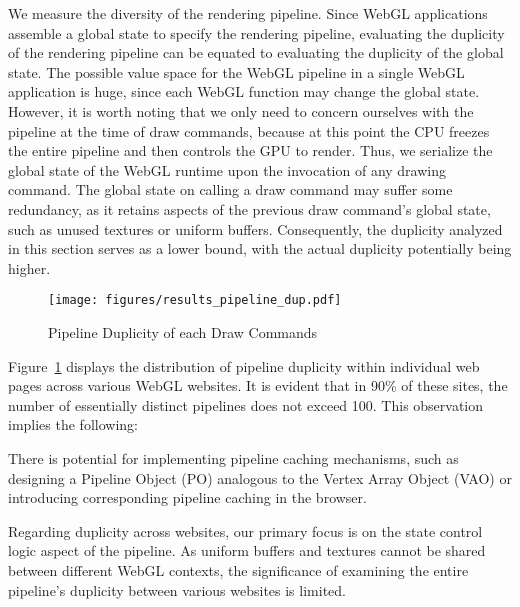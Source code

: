 We measure the diversity of the rendering pipeline. Since WebGL applications assemble a global state to specify the rendering pipeline, evaluating the duplicity of the rendering pipeline can be equated to evaluating the duplicity of the global state. The possible value space for the WebGL pipeline in a single WebGL application is huge, since each WebGL function may change the global state. However, it is worth noting that we only need to concern ourselves with the pipeline at the time of draw commands, because at this point the CPU freezes the entire pipeline and then controls the GPU to render. Thus, we serialize the global state of the WebGL runtime upon the invocation of any drawing command. 
The global state on calling a draw command may suffer some redundancy, as it retains aspects of the previous draw command’s global state, such as unused textures or uniform buffers. Consequently, the duplicity analyzed in this section serves as a lower bound, with the actual duplicity potentially being higher.

\begin{figure}[tp]
\centering
\texttt{[image: figures/results\_pipeline\_dup.pdf]}
\caption{Pipeline Duplicity of each Draw Commands}\label{fig_results_pipeline_dup}
\end{figure}

Figure\ \ref{fig_results_pipeline_dup} displays the distribution of pipeline duplicity within individual web pages across various WebGL websites. It is evident that in 90\% of these sites, the number of essentially distinct pipelines does not exceed 100. This observation implies the following:

There is potential for implementing pipeline caching mechanisms, such as designing a Pipeline Object (PO) analogous to the Vertex Array Object (VAO) or introducing corresponding pipeline caching in the browser.

Regarding duplicity across websites, our primary focus is on the state control logic aspect of the pipeline. As uniform buffers and textures cannot be shared between different WebGL contexts, the significance of examining the entire pipeline’s duplicity between various websites is limited.

